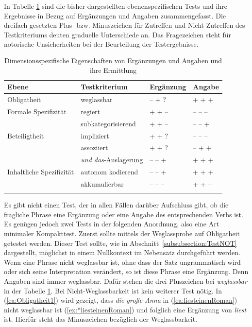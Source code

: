 In Tabelle \ref{tab:ValDimTest} sind die bisher dargestellten ebenenspezifischen Tests und ihre Ergebnisse in Bezug auf Ergänzungen und Angaben zusammengefasst. Die dreifach gesetzten Plus- bzw. Minuszeichen für Zutreffen und Nicht-Zutreffen des Testkriteriums deuten graduelle Unterschiede an. Das Fragezeichen steht für notorische Unsicherheiten bei der Beurteilung der Testergebnisse. 

\begin{table}[!htbp]
	\centering
	\begin{tabular}{llll}
		\lsptoprule
		Ebene & Testkriterium & Ergänzung & Angabe \\
		\midrule
        Obligatheit & weglassbar & -- + ? & + + + \\
		Formale Spezifizität & regiert &  + + -- & -- -- -- \\
		& subkategorisierend & + + -- & -- -- + \\
        Beteiligtheit & impliziert & + + ? & -- -- -- \\
		&  assoziiert & + + ? & -- + + \\  
		& \textit{und das}-Auslagerung & -- -- + & + + + \\
		Inhaltliche Spezifizität & autonom kodierend & -- -- + & + + + \\
		& akkumulierbar & -- -- -- & + + -- \\ 
		\lspbottomrule
	\end{tabular}
	\caption{Dimensionsspezifische Eigenschaften von Ergänzungen und Angaben und ihre Ermittlung}
	\label{tab:ValDimTest}
\end{table}

Es gibt nicht einen Test, der in allen Fällen darüber Aufschluss gibt, ob die fragliche Phrase eine Ergänzung oder eine Angabe des entsprechenden Verbs ist. Es genügen jedoch zwei Tests in der folgenden Anordnung, also eine Art minimaler Kompakttest. Zuerst sollte mittels der Weglassprobe auf Obligatheit getestet werden. Dieser Test sollte, wie in Abschnitt~\ref{subsubsection:TestNOT} dargestellt, möglichst in einem Nullkontext im Nebensatz durchgeführt werden. Wenn eine Phrase nicht weglassbar ist, ohne dass der Satz ungrammatisch wird oder sich seine Interpretation verändert, so ist diese Phrase eine Ergänzung. Denn Angaben sind immer weglassbar. Dafür stehen die drei Pluszeichen bei \textit{weglassbar} in der Tabelle \ref{tab:ValDimTest}. Bei Nicht-Weglassbarkeit ist kein weiterer Test nötig. In (\ref{ea:Obligatheit1}) wird gezeigt, dass \textit{die große Anna} in (\ref{ea:liesteinenRoman}) nicht weglassbar ist (\ref{ex:*liesteinenRoman}) und folglich eine Ergänzung von \textit{liest} ist. Hierfür steht das Minuszeichen bezüglich der Weglassbarkeit.

